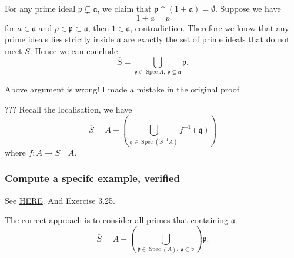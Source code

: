 For any prime ideal $\mathfrak p\subsetneq \mathfrak a$, we claim that $\mathfrak p\cap (1+\mathfrak a)=\emptyset$. Suppose we have 
$$1+a=p$$ for $a\in\mathfrak a$ and $p\in\mathfrak p\subset\mathfrak a$, then $1\in \mathfrak a$, contradiction. 
Therefore we know that any prime ideals lies strictly inside $\mathfrak a$ are exactly the set of prime ideals that do not meet $S$. Hence we can conclude 
$$\overline{S}=\bigcup_{\mathfrak p\in\operatorname{Spec}A,~\mathfrak p\subsetneq \mathfrak a}\mathfrak p.$$

Above argument is wrong! I made a mistake in the original proof 

??? Recall the localisation, we have 
$$\overline{S}=A-\left(\bigcup_{\mathfrak q\in\operatorname{Spec}(S^{-1}A)}f^{-1}(\mathfrak q)\right)$$ where $f:A\to S^{-1}A$.

\subsubsection{Compute a specifc example, verified}

See \href{https://math.stackexchange.com/questions/1635191/saturation-of-a-multiplicatively-closed-subset}{HERE}. And \cite{altman} Exercise 3.25. 

The correct approach is to consider all primes that containing $\mathfrak a$.
$$\overline{S}=A-\left(\bigcup_{\mathfrak p\in\operatorname{Spec}(A),~ \mathfrak a\subset\mathfrak p}\right)\mathfrak p.$$